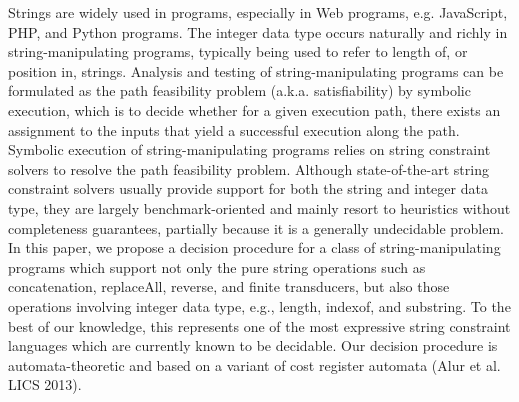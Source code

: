 
Strings are widely used in programs, especially in Web programs, e.g. JavaScript, PHP, and Python programs. The integer data type occurs naturally and richly in string-manipulating programs, typically being used to refer to length of, or position in, strings. 
Analysis and testing of string-manipulating programs can be formulated as the path feasibility problem (a.k.a. satisfiability) by symbolic execution, which is to decide whether 
for a given execution path, there exists an assignment to the inputs that yield a successful execution along the path. 
Symbolic execution of string-manipulating programs relies on string constraint solvers to resolve the path feasibility problem.
Although state-of-the-art string constraint solvers usually provide support for both the string and integer data type,   
they are largely benchmark-oriented and mainly resort to heuristics without completeness guarantees, partially because it is a generally undecidable problem. \\
%
In this paper, we propose a decision procedure 
for a class of string-manipulating programs
which support  not only the pure string operations %
such as concatenation, replaceAll, reverse, and finite transducers, but also those operations involving integer data type, e.g., length, indexof, and substring. To the best of our knowledge, this represents one of the most expressive string constraint languages which are currently known to be decidable. 
Our decision procedure is automata-theoretic and based on a variant of cost register automata (Alur et al. LICS 2013). 
